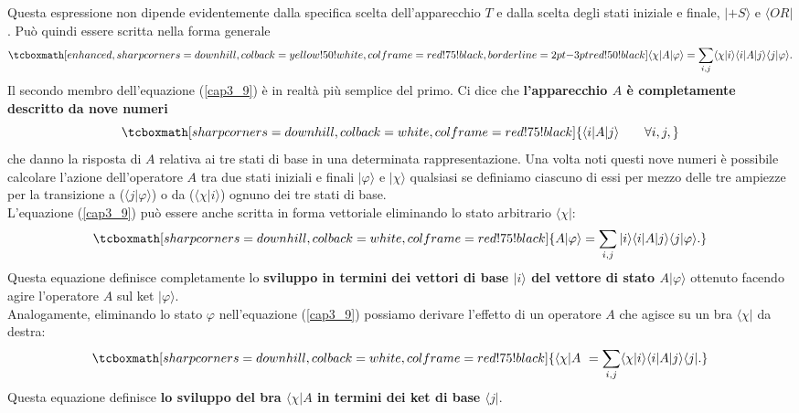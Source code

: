 \documentclass[a4paper,12pt,oneside]{book}
\begin{document}
Questa espressione non dipende evidentemente dalla specifica scelta dell'apparecchio $T$ e dalla scelta degli stati iniziale e finale, $| +S \rangle $ e $\langle OR |$. Può quindi essere scritta nella forma generale
	\begin{equation}
		\tcboxmath[enhanced,sharp corners=downhill ,colback=yellow!50!white,colframe=red!75!black, borderline={2pt}{-3pt}{red!50!black}]{
			\langle \chi | A | \varphi \rangle = \sum \limits_{i,j} \langle \chi | i \rangle \langle i | A | j \rangle \langle j | \varphi \rangle .
			}
	\label{cap3_9}
	\end{equation}
Il secondo membro dell'equazione (\ref{cap3_9}) è in realtà più semplice del primo. Ci dice che \textbf{l'apparecchio $A$ è completamente descritto da nove numeri}
	\begin{equation}
		\tcboxmath[sharp corners=downhill ,colback=white,colframe=red!75!black]{
			\langle i | A | j \rangle  \qquad \forall i,j ,
			}
	\end{equation}
che danno la risposta di $A$ relativa ai tre stati di base in una determinata rappresentazione. Una volta noti questi nove numeri è possibile calcolare l'azione dell'operatore $A$ tra due stati iniziali e finali $| \varphi \rangle $ e $| \chi \rangle$ qualsiasi se definiamo ciascuno di essi per mezzo delle tre ampiezze per la transizione a ($\langle j | \varphi \rangle $) o da ($\langle \chi | i \rangle$) ognuno dei tre stati di base.\\

L'equazione (\ref{cap3_9}) può essere anche scritta in forma vettoriale eliminando lo stato arbitrario $\langle \chi | $:
	\begin{equation}
		\tcboxmath[sharp corners=downhill ,colback=white,colframe=red!75!black]{
			A| \varphi \rangle = \sum \limits_{i,j}  |i \rangle \langle i | A | j \rangle \langle j | \varphi \rangle .
			}
	\label{cap3_10}
	\end{equation}
Questa equazione definisce completamente lo \textbf{sviluppo in termini dei vettori di base $ | i \rangle$ del vettore di stato $A | \varphi \rangle $} ottenuto facendo agire l'operatore $A$ sul ket $ | \varphi \rangle$.\\

Analogamente, eliminando lo stato $\varphi$ nell'equazione (\ref{cap3_9}) possiamo derivare l'effetto di un operatore $A$ che agisce su un bra $ \langle \chi |$ da destra:
	\begin{equation}
		\tcboxmath[sharp corners=downhill ,colback=white,colframe=red!75!black]{
			\langle \chi | A\ = \sum \limits_{i,j} \langle \chi | i \rangle \langle i | A  | j \rangle \langle j | .
			}	
	\label{cap3_11}
	\end{equation}
Questa equazione definisce \textbf{lo sviluppo del bra $\langle \chi |A$ in termini dei ket di base $\langle j |$}.\\
\end{document}
